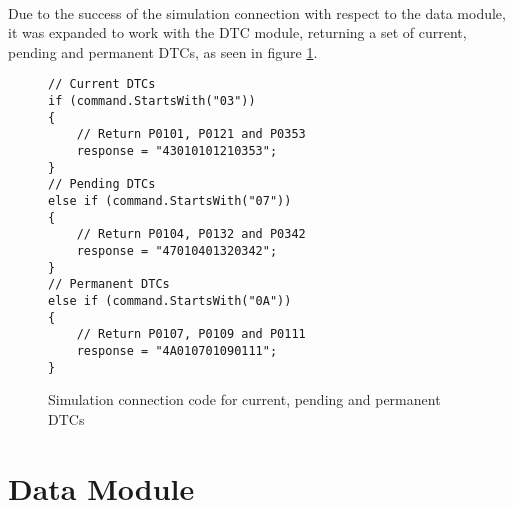 		\paragraph{}{
		Due to the success of the simulation connection with respect to the data module, it was expanded to work with the DTC module, returning a set of current, pending and permanent DTCs, as seen in figure \ref{code:SimConnectionDTC}.
		}
		
		\begin{figure}[h]
			\begin{lstlisting}
// Current DTCs
if (command.StartsWith("03"))
{
	// Return P0101, P0121 and P0353	
	response = "43010101210353";
}
// Pending DTCs
else if (command.StartsWith("07"))
{
	// Return P0104, P0132 and P0342	
	response = "47010401320342";
}
// Permanent DTCs
else if (command.StartsWith("0A"))
{
	// Return P0107, P0109 and P0111	
	response = "4A010701090111";
}			
			\end{lstlisting}
			\caption{Simulation connection code for current, pending and permanent DTCs}
			\label{code:SimConnectionDTC}
		\end{figure}

\section{Data Module}

